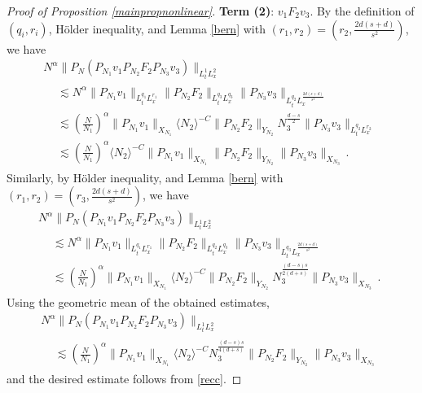 \documentclass[10pt,leqno]{amsart}
\numberwithin{equation}{section}
\begin{document}
\begin{proof}[Proof of Proposition \ref{mainpropnonlinear}]
\textbf{Term (2)}: $v_1 F_2 v_3$. By the definition of $(q_i, r_i)$, H\" older inequality, 
and Lemma \ref{bern} with $(r_1, r_2) = (r_2, \frac{2d (s+d)}{s^2})$, we have
\begin{multline*}
N^\alpha \|P_N (P_{N_1} v_1  P_{N_2} F_2 P_{N_3} v_3) \|_{L_t^{1} L_x^{2}} \\
\begin{aligned}
& \lesssim  N^\alpha \|P_{N_1} v_1\|_{L_t^{q_1}L_x^{r_1}} \|P_{N_2} F_2\|_{L_t^{q_3 } L_x^{q_3}} \|P_{N_3} v_3\|_{L_t^{q_2} L_x^{\frac{2d (s+d)}{s^2}}}\\
& \lesssim \left(\frac{N}{N_1}\right)^\alpha \|P_{N_1} v_1\|_{X_{N_1}} \langle N_2 \rangle^{-C} \|P_{N_2} F_2\|_{Y_{N_2}}  N_3^{\frac{d-s}{2} } \|P_{N_3} v_3\|_{L_t^{q_2} L_x^{r_2}}  \\
&\lesssim  \left(\frac{N}{N_1}\right)^\alpha \langle N_2 \rangle^{-C}  \|P_{N_1} v_1\|_{X_{N_1}} \|P_{N_2} F_2\|_{Y_{N_2}} \|P_{N_3} v_3\|_{X_{N_3}} \,.
\end{aligned}
\end{multline*}
Similarly, by H\" older inequality, 
and Lemma \ref{bern} with $(r_1, r_2) = (r_3, \frac{2d (s+d)}{s^2})$, we have
\begin{multline*}
N^\alpha \|P_N (P_{N_1} v_1  P_{N_2} F_2 P_{N_3} v_3) \|_{L_t^{1} L_x^{2}} \\
\begin{aligned}
& \lesssim  N^\alpha \|P_{N_1} v_1\|_{L_t^{q_1}L_x^{r_1}} \|P_{N_2} F_2\|_{L_t^{q_2 } L_x^{q_3}} \|P_{N_3} v_3\|_{L_t^{q_3} L_x^{\frac{2d (s+d)}{s^2}}}\\
&\lesssim  \left(\frac{N}{N_1}\right)^\alpha  \|P_{N_1} v_1\|_{X_{N_1}} \langle N_2 \rangle^{-C}  \|P_{N_2} F_2\|_{Y_{N_2}} N_3^{\frac{(d-s)s}{2(d+s)}} \|P_{N_3} v_3\|_{X_{N_3}} \,.
\end{aligned}
\end{multline*}
Using the geometric mean of the obtained estimates, 
\begin{multline*}
N^\alpha \|P_N (P_{N_1} v_1  P_{N_2} F_2 P_{N_3} v_3) \|_{L_t^{1} L_x^{2}} \\
\begin{aligned}
&\lesssim  \left(\frac{N}{N_1}\right)^\alpha  \|P_{N_1} v_1\|_{X_{N_1}} \langle N_2 \rangle^{-C} N_3^{\frac{(d-s)s}{4(d+s)}} \|P_{N_2} F_2\|_{Y_{N_2}}  \|P_{N_3} v_3\|_{X_{N_3}} 
\end{aligned}
\end{multline*}
and the desired estimate follows from \eqref{recc}.


\end{proof}
\end{document}
